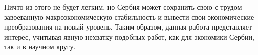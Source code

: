 Ничто из этого не будет легким, но Сербия может сохранить свою с трудом завоеванную макроэкономическую стабильность и вывести свои экономические преобразования на новый уровень.
Таким образом, данная работа представляет интерес, учитывая явную нехватку подобных работ, как для экономики Сербии, так и в научном кругу.
